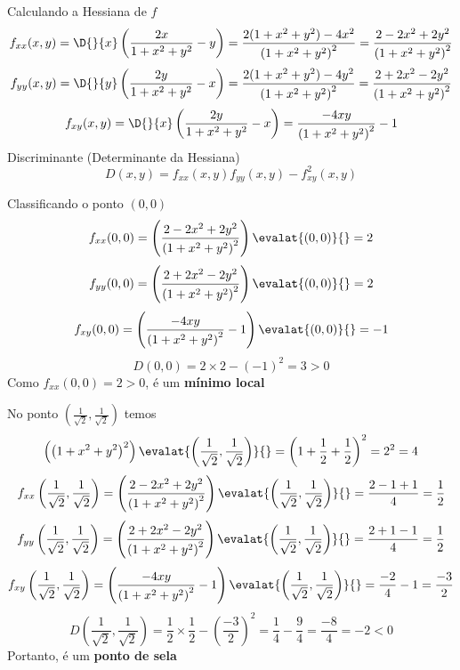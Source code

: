 \documentclass[a4paper,12pt,fleqn]{article}
\begin{document}
\begin{answer}
  \bigskip
  Calculando a Hessiana de $f$
  \[
    f_{xx}(x, y)
    = \D{}{x}\left(\frac{2x}{1+x^2+y^2} - y\right)
    = \frac{2(1+x^2+y^2)-4x^2}{\left(1+x^2+y^2\right)^2}
    = \frac{2-2x^2+2y^2}{\left(1+x^2+y^2\right)^2}
  \]
  \[
    f_{yy}(x, y)
    = \D{}{y}\left(\frac{2y}{1+x^2+y^2} - x\right)
    = \frac{2(1+x^2+y^2)-4y^2}{\left(1+x^2+y^2\right)^2}
    = \frac{2+2x^2-2y^2}{\left(1+x^2+y^2\right)^2}
  \]
  \[
    f_{xy}(x, y)
    = \D{}{x}\left(\frac{2y}{1+x^2+y^2} - x\right)
    = \frac{-4xy}{\left(1+x^2+y^2\right)^2} -1
  \]
  Discriminante (Determinante da Hessiana)
  \[
    D(x, y) = f_{xx}(x, y)f_{yy}(x, y) - f^2_{xy}(x, y)
  \]

  \bigskip
  Classificando o ponto \((0, 0)\)
  \[
    f_{xx}(0, 0)
    = \left(\frac{2-2x^2+2y^2}{\left(1+x^2+y^2\right)^2}\right)\evalat{(0, 0)}{}
    = 2
  \]
  \[
    f_{yy}(0, 0)
    = \left(\frac{2+2x^2-2y^2}{\left(1+x^2+y^2\right)^2}\right)\evalat{(0, 0)}{}
    = 2
  \]
  \[
    f_{xy}(0, 0)
    = \left(\frac{-4xy}{\left(1+x^2+y^2\right)^2} -1\right)\evalat{(0, 0)}{}
    = -1
  \]
  \[
    D(0, 0)
    = 2 \times 2 - (-1)^2
    = 3 > 0
  \]
  Como \(f_{xx}(0, 0) = 2 > 0\), é um \textbf{mínimo local}

  \bigskip
  No ponto \(\left( \frac{1}{\sqrt{2}},  \frac{1}{\sqrt{2}}\right)\)
  temos
  \[
    \left(\left(1+x^2+y^2\right)^2\right)\evalat{\left( \frac{1}{\sqrt{2}},  \frac{1}{\sqrt{2}}\right)}{}
    = \left(1+\frac{1}{2}+\frac{1}{2}\right)^2
    = 2^2
    = 4
  \]
  \[
    f_{xx}\left( \frac{1}{\sqrt{2}},  \frac{1}{\sqrt{2}}\right)
    = \left(\frac{2-2x^2+2y^2}{\left(1+x^2+y^2\right)^2}\right)\evalat{\left( \frac{1}{\sqrt{2}},  \frac{1}{\sqrt{2}}\right)}{}
    = \frac{2-1+1}{4}
    = \frac{1}{2}
  \]
  \[
    f_{yy}\left( \frac{1}{\sqrt{2}},  \frac{1}{\sqrt{2}}\right)
    = \left(\frac{2+2x^2-2y^2}{\left(1+x^2+y^2\right)^2}\right)\evalat{\left( \frac{1}{\sqrt{2}},  \frac{1}{\sqrt{2}}\right)}{}
    = \frac{2+1-1}{4}
    = \frac{1}{2}
  \]
  \[
    f_{xy}\left( \frac{1}{\sqrt{2}},  \frac{1}{\sqrt{2}}\right)
    = \left(\frac{-4xy}{\left(1+x^2+y^2\right)^2} -1\right)\evalat{\left( \frac{1}{\sqrt{2}},  \frac{1}{\sqrt{2}}\right)}{}
    = \frac{-2}{4} -1
    = \frac{-3}{2}
  \]
  \[
    D\left( \frac{1}{\sqrt{2}},  \frac{1}{\sqrt{2}}\right)
    = \frac{1}{2}\times\frac{1}{2} - \left(\frac{-3}{2}\right)^2
    = \frac{1}{4} - \frac{9}{4}
    = \frac{-8}{4}
    = -2
    < 0
  \]
  Portanto, é um \textbf{ponto de sela}


\end{answer}
\end{document}
